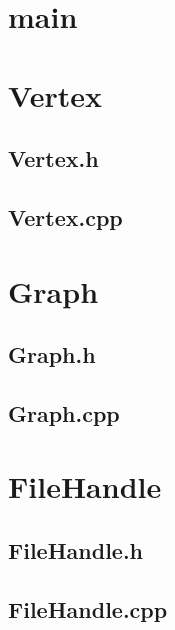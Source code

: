 \appendices
\section{main}
\label{app:main}

\bigskip
\bigskip

\section{Vertex}
\subsection{Vertex.h}
\label{app:vertex_h}

\bigskip
\bigskip

\subsection{Vertex.cpp}
\label{app:vertex_cpp}

\bigskip
\bigskip

\section{Graph}
\label{app:graph}
\subsection{Graph.h}
\label{app:graph_h}

\bigskip
\bigskip

\subsection{Graph.cpp}
\label{app:graph_cpp}

\bigskip
\bigskip

\section{FileHandle}
\label{app:FileHandle}
\subsection{FileHandle.h}
\label{app:FileHandle_h}

\bigskip
\bigskip

\subsection{FileHandle.cpp}
\label{app:FileHandle_cpp}

\bigskip
\bigskip

